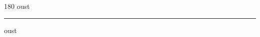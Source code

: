 
\begin{frame}
\begin{center}
\begin{turn}{180}
{\fontsize{2.5cm}{1em}\selectfont oust}
\end{turn}
\vspace{1em}\par  
\hrule
\vspace{1em}\par  
{\fontsize{2.5cm}{1em}\selectfont oust}
\end{center}
\end{frame}
